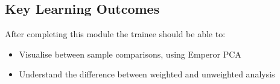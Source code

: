 
\chapter{\moduleTitle}
\newpage


% 
\section{Key Learning Outcomes}

After completing this module the trainee should be able to:
\begin{itemize}
  \item Visualise between sample comparisons, using Emperor PCA
  \item Understand the difference between weighted and unweighted analysis
\end{itemize}

